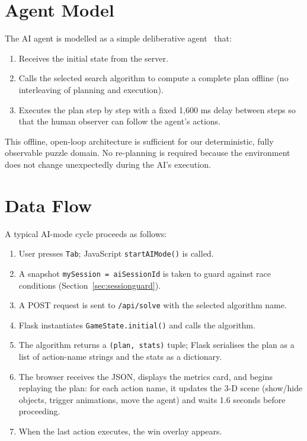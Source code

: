 \documentclass[12pt, a4paper]{report}
\begin{document}
\section{Agent Model}

The AI agent is modelled as a simple deliberative agent~\cite{russell2020ai}
that:

\begin{enumerate}[leftmargin=1.5em]
  \item Receives the initial state from the server.
  \item Calls the selected search algorithm to compute a complete plan offline
        (no interleaving of planning and execution).
  \item Executes the plan step by step with a fixed 1,600 ms delay between
        steps so that the human observer can follow the agent's actions.
\end{enumerate}

This offline, open-loop architecture is sufficient for our deterministic, fully
observable puzzle domain.  No re-planning is required because the environment
does not change unexpectedly during the AI's execution.

\section{Data Flow}

A typical AI-mode cycle proceeds as follows:

\begin{enumerate}[leftmargin=1.5em]
  \item User presses \texttt{Tab}; JavaScript \texttt{startAIMode()} is called.
  \item A snapshot \texttt{mySession = aiSessionId} is taken to guard against
        race conditions (Section~\ref{sec:sessionguard}).
  \item A POST request is sent to \texttt{/api/solve} with the selected
        algorithm name.
  \item Flask instantiates \texttt{GameState.initial()} and calls the
        algorithm.
  \item The algorithm returns a \texttt{(plan, stats)} tuple; Flask serialises
        the plan as a list of action-name strings and the stats as a dictionary.
  \item The browser receives the JSON, displays the metrics card, and begins
        replaying the plan: for each action name, it updates the 3-D scene
        (show/hide objects, trigger animations, move the agent) and waits
        1.6 seconds before proceeding.
  \item When the last action executes, the win overlay appears.
\end{enumerate}
\end{document}
